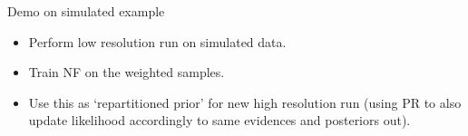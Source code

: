 \documentclass[aspectratio=169]{beamer}
\begin{document}
\begin{frame}{Demo on simulated example}
\begin{minipage}{0.45\textwidth}\vspace{1em}
\begin{itemize}
    \item<1-> Perform low resolution run on simulated data.
    \item<2-> Train NF on the weighted samples.
    \item<3-> Use this as `repartitioned prior' for new high resolution run (using PR to also update likelihood accordingly to same evidences and posteriors out).
\end{itemize}
\end{minipage}
\begin{minipage}{0.45\textwidth}
\end{minipage}
\end{frame}
\end{document}
